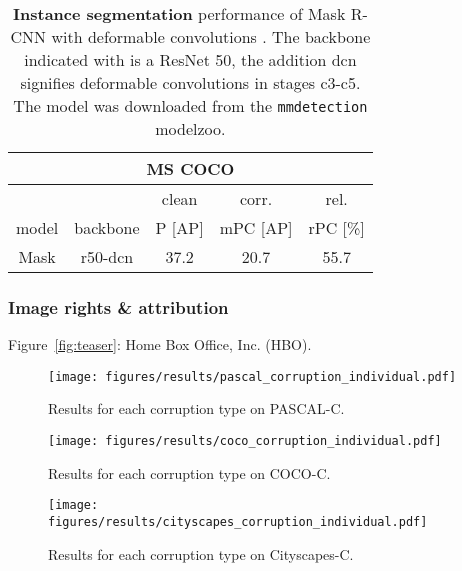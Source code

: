 \documentclass{article}
\begin{document}
\begin{table}[t!]
\begin{center}
\begin{tabular}{c|c|ccc}
\multicolumn{5}{c}{MS COCO} \\
\toprule
\multicolumn{2}{c}{} & clean & corr. & rel.\\
model & backbone & P \small{[AP]} & mPC \small{[AP]} & rPC \small{[\%]}\\
\hline
Mask & r50-dcn & 37.2 & 20.7 & 55.7\\
\bottomrule
\end{tabular}
\caption{\textbf{Instance segmentation} performance of Mask R-CNN with deformable convolutions \citep{dai2017deformable}. The backbone indicated with  is a ResNet 50, the addition dcn signifies deformable convolutions in stages c3-c5. The model was downloaded from the \texttt{mmdetection} modelzoo.}
\label{table:results_corruption_benchmark_dcn_instance_segmentation}
\end{center}
\end{table}

\subsubsection*{Image rights \& attribution}
Figure~\ref{fig:teaser}: Home Box Office, Inc. (HBO).





\begin{figure*}[ht]
    \begin{center}
    \texttt{[image: figures/results/pascal\_corruption\_individual.pdf]}
    \end{center}
    \vspace{-0.2cm}
    \caption{Results for each corruption type on PASCAL-C.}
\label{fig:results_pascal_individual}
\end{figure*}

\begin{figure*}[t]
    \begin{center}
    \texttt{[image: figures/results/coco\_corruption\_individual.pdf]}
    \end{center}
    \vspace{-0.2cm}
    \caption{Results for each corruption type on COCO-C.}
\label{fig:results_Coco_individual}
\end{figure*}

\begin{figure*}[t]
    \begin{center}
    \texttt{[image: figures/results/cityscapes\_corruption\_individual.pdf]}
    \end{center}
    \vspace{-0.2cm}
    \caption{Results for each corruption type on Cityscapes-C.}
\label{fig:results_cityscapes_individual}
\end{figure*}
\end{document}
